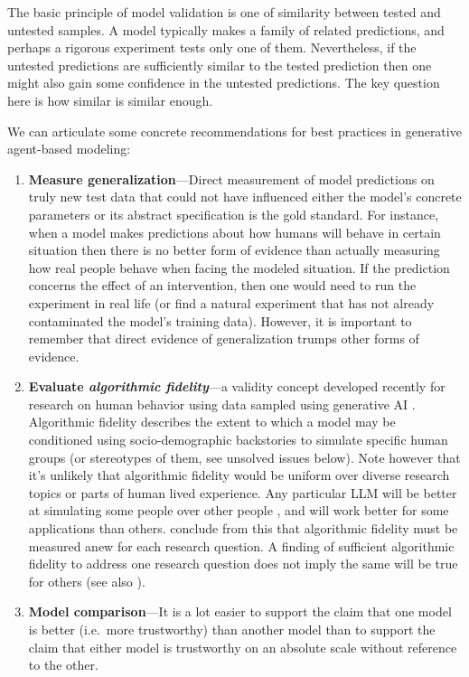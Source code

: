 \documentclass[11pt, a4paper, logo, twocolumn, internal, copyright, numbering]{googledeepmind}
\begin{document}
The basic principle of model validation is one of similarity between tested and untested samples. A model typically makes a family of related predictions, and perhaps a rigorous experiment tests only one of them. Nevertheless, if the untested predictions are sufficiently similar to the tested prediction then one might also gain some confidence in the untested predictions. The key question here is how similar is similar enough.

We can articulate some concrete recommendations for best practices in generative agent-based modeling:
\begin{enumerate}
    \item \textbf{Measure generalization}---Direct measurement of model predictions on truly new test data that could not have influenced either the model's concrete parameters or its abstract specification is the gold standard. For instance, when a model makes predictions about how humans will behave in certain situation then there is no better form of evidence than actually measuring how real people behave when facing the modeled situation. If the prediction concerns the effect of an intervention, then one would need to run the experiment in real life (or find a natural experiment that has not already contaminated the model's training data). However, it is important to remember that direct evidence of generalization trumps other forms of evidence.
    
    \item \textbf{Evaluate \textit{algorithmic fidelity}}---a validity concept developed recently for research on human behavior using data sampled using generative AI \citep{argyle2023out}. Algorithmic fidelity describes the extent to which a model may be conditioned using socio-demographic backstories to simulate specific human groups (or stereotypes of them, see unsolved issues below). Note however that it's unlikely that algorithmic fidelity would be uniform over diverse research topics or parts of human lived experience. Any particular LLM will be better at simulating some people over other people \citep{atari2023humans}, and will work better for some applications than others. \cite{argyle2023out} conclude from this that algorithmic fidelity must be measured anew for each research question. A finding of sufficient algorithmic fidelity to address one research question does not imply the same will be true for others (see also \cite{santurkar2023whose, amirova2023framework}).

    \item \textbf{Model comparison}---It is a lot easier to support the claim that one model is better (i.e.~more trustworthy) than another model than to support the claim that either model is trustworthy on an absolute scale without reference to the other. 
    

\end{enumerate}
\end{document}
